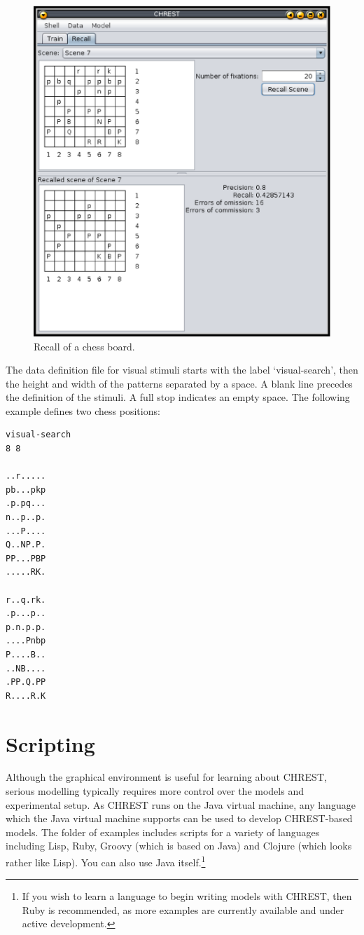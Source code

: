 \documentclass{article}
\begin{document}
\begin{figure}
\includegraphics[width=\textwidth]{images/recall.eps}
\caption{Recall of a chess board.}
\label{recall}
\end{figure}

The data definition file for visual stimuli starts with the label
`visual-search', then the height and width of the patterns separated by a
space.  A blank line precedes the definition of the stimuli.  A full stop
indicates an empty space.  The following example defines two chess positions:

\begin{verbatim}
visual-search
8 8

..r.....
pb...pkp
.p.pq...
n..p..p.
...P....
Q..NP.P.
PP...PBP
.....RK.

r..q.rk.
.p...p..
p.n.p.p.
....Pnbp
P....B..
..NB....
.PP.Q.PP
R....R.K
\end{verbatim}

\newpage
\section{Scripting}

Although the graphical environment is useful for learning about CHREST, serious
modelling typically requires more control over the models and experimental
setup.  As CHREST runs on the Java virtual machine, any language which the Java
virtual machine supports can be used to develop CHREST-based models.  The
folder of examples includes scripts for a variety of languages including Lisp,
Ruby, Groovy (which is based on Java) and Clojure (which looks rather like
Lisp).  You can also use Java itself.\footnote{If you wish to learn a language
to begin writing models with CHREST, then Ruby is recommended, as more examples
are currently available and under active development.}
\end{document}
